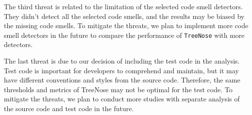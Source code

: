 The third threat is related to the limitation of the selected code smell
detectors. They didn't detect all the selected code smells, and the results may
be biased by the missing code smells. To mitigate the threats, we plan to
implement more code smell detectors in the future to compare the performance of
\texttt{TreeNose} with more detectors.

The last threat is due to our decision of including the test code in the
analysis. Test code is important for developers to comprehend and maintain, but
it may have different conventions and styles from the source code. Therefore,
the same thresholds and metrics of TreeNose may not be optimal for the test
code. To mitigate the threats, we plan to conduct more studies with separate
analysis of the source code and test code in the future.
